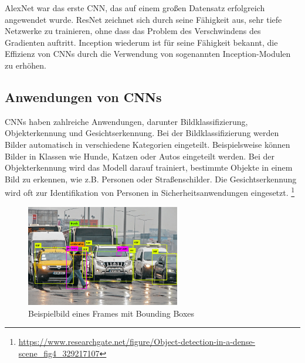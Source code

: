         AlexNet war das erste CNN, das auf einem großen Datensatz erfolgreich angewendet wurde.
        ResNet zeichnet sich durch seine Fähigkeit aus, sehr tiefe Netzwerke zu trainieren, ohne dass das Problem des Verschwindens des Gradienten auftritt.
        Inception wiederum ist für seine Fähigkeit bekannt, die Effizienz von CNNs durch die Verwendung von sogenannten Inception-Modulen zu erhöhen.

    
    \subsection{Anwendungen von CNNs}
    
        CNNs haben zahlreiche Anwendungen, darunter Bildklassifizierung, Objekterkennung und Gesichtserkennung.      
        Bei der Bildklassifizierung werden Bilder automatisch in verschiedene Kategorien eingeteilt.      
        Beispielsweise können Bilder in Klassen wie Hunde, Katzen oder Autos eingeteilt werden.  
        Bei der Objekterkennung wird das Modell darauf trainiert, bestimmte Objekte in einem Bild zu erkennen, wie z.B.      Personen oder Straßenschilder.      
        Die Gesichtserkennung wird oft zur Identifikation von Personen in Sicherheitsanwendungen eingesetzt.
        \footnote{\url{https://www.researchgate.net/figure/Object-detection-in-a-dense-scene_fig4_329217107}}

        \begin{figure}[h]
            \centering
            \includegraphics[width=0.6\textwidth]{img/Object-detection-in-a-dense-scene.ppm.png}
            \caption{Beispielbild eines Frames mit Bounding Boxes}
            \label{fig:Beispielbild_eines_Frames_mit_Bounding_Boxes}
        \end{figure}


